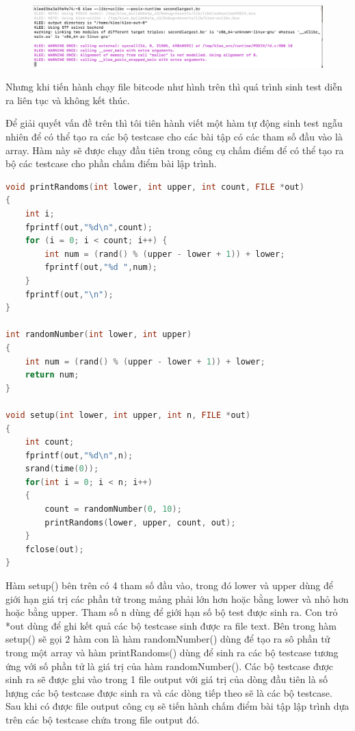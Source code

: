 \documentclass[12pt,a4paper]{article}
\begin{document}
\begin{figure}[ht]
\begin{center}
\includegraphics[scale=.3]{hinhanh/runningkleearray.png}
\end{center}
\end{figure}

Nhưng khi tiến hành chạy file bitcode như hình trên thì quá trình sinh test diễn ra liên tục và không kết thúc. 

Để giải quyết vấn đề trên thì tôi tiên hành viết một hàm tự động sinh test ngẫu nhiên để có thể tạo ra các bộ testcase cho các bài tập có các tham số đầu vào là array. Hàm này sẽ được chạy đầu tiên trong công cụ chấm điểm để có thể tạo ra bộ các testcase cho phần chấm điểm bài lập trình.

\begin{lstlisting}[language=c]
void printRandoms(int lower, int upper, int count, FILE *out) 
{ 
    int i;
    fprintf(out,"%d\n",count);
    for (i = 0; i < count; i++) { 
        int num = (rand() % (upper - lower + 1)) + lower; 
        fprintf(out,"%d ",num); 
    }
    fprintf(out,"\n"); 
} 

int randomNumber(int lower, int upper)
{
    int num = (rand() % (upper - lower + 1)) + lower; 
    return num;
}

void setup(int lower, int upper, int n, FILE *out)
{
    int count;
    fprintf(out,"%d\n",n);
    srand(time(0)); 
    for(int i = 0; i < n; i++)
    {
        count = randomNumber(0, 10);
        printRandoms(lower, upper, count, out);
    } 
    fclose(out);
}
\end{lstlisting}

Hàm setup() bên trên có 4 tham số đầu vào, trong đó lower và upper dùng để giới hạn giá trị các phần tử trong mảng phải lớn hơn hoặc bằng lower và nhỏ hơn hoặc bằng upper. Tham số n dùng để giới hạn số bộ test được sinh ra. Con trỏ *out dùng để ghi kết quả các bộ testcase sinh được ra file text. Bên trong hàm setup() sẽ gọi 2 hàm con là hàm randomNumber() dùng để tạo ra sô phần tử trong một array và hàm printRandoms() dùng để sinh ra các bộ testcase tương ứng với số phần tử là giá trị của hàm randomNumber(). Các bộ testcase được sinh ra sẽ được ghi vào trong 1 file output với giá trị của dòng đầu tiên là số lượng các bộ testcase được sinh ra và các dòng tiếp theo sẽ là các bộ testcase.
Sau khi có được file output công cụ sẽ tiến hành chấm điểm bài tập lập trình dựa trên các bộ testcase chứa trong file output đó.
\end{document}
